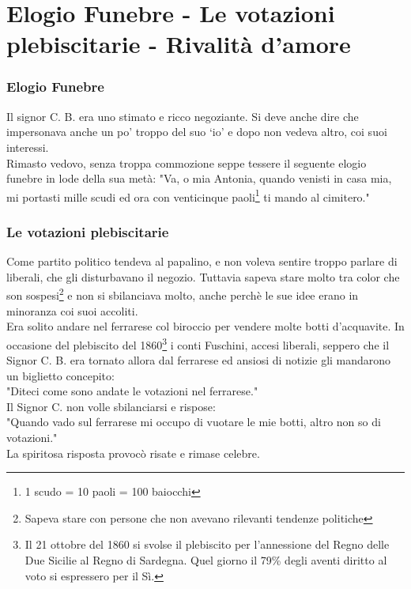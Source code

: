 \documentclass[10pt]{memoir} %
\begin{document}
\chapter{Elogio Funebre - Le votazioni plebiscitarie - Rivalità d'amore}
\subsection{Elogio Funebre}
Il signor C. B. era uno stimato e ricco negoziante. Si deve anche dire che impersonava anche un po' troppo del suo ‘io' e dopo non vedeva altro, coi suoi interessi.\\
Rimasto vedovo, senza troppa commozione seppe tessere il seguente elogio funebre in lode della sua metà:
"Va, o mia Antonia, quando venisti in casa mia, mi portasti mille scudi ed ora con venticinque paoli\footnote{1 scudo = 10 paoli = 100 baiocchi} ti mando al cimitero."\\
\subsection{Le votazioni plebiscitarie}
Come partito politico tendeva al papalino, e non voleva sentire troppo parlare di liberali, che gli disturbavano il negozio. Tuttavia sapeva stare molto tra color che son sospesi\footnote{Sapeva stare con persone che non avevano rilevanti tendenze politiche} e non si sbilanciava molto, anche perchè le sue idee erano in minoranza coi suoi accoliti.\\
Era solito andare nel ferrarese col biroccio per vendere molte botti d'acquavite. In occasione del plebiscito del 1860\footnote{Il 21 ottobre del 1860 si svolse il plebiscito per l’annessione del Regno delle Due Sicilie al Regno di Sardegna. Quel giorno il 79\% degli aventi diritto al voto si espressero per il Sì.} i conti Fuschini, accesi liberali, seppero che il Signor C. B. era tornato allora dal ferrarese ed ansiosi di notizie gli mandarono un biglietto concepito:\\
"Diteci come sono andate le votazioni nel ferrarese."\\
Il Signor C. non volle sbilanciarsi e rispose:\\
"Quando vado sul ferrarese mi occupo di vuotare le mie botti, altro non so di votazioni."\\
La spiritosa risposta provocò risate e rimase celebre. \\
\end{document}
